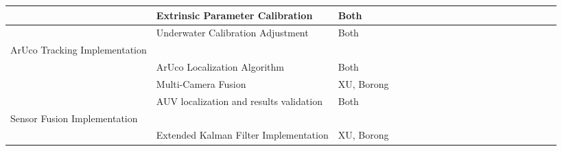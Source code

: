 \documentclass[11pt]{article}
\begin{document}
\begin{adjustbox}{max width=\textheight, angle=90}
\begin{tabular}{|p{3cm}|p{3cm}|p{1.5cm}|p{0.75cm}|p{0.75cm}|p{0.75cm}|p{0.75cm}|p{0.75cm}|p{0.75cm}|p{0.75cm}|p{0.75cm}|p{0.75cm}|p{0.9cm}|p{0.9cm}|p{0.9cm}|p{0.9cm}|p{0.9cm}|p{0.9cm}|p{0.9cm}|p{0.9cm}|}
        \hline
         &Extrinsic Parameter Calibration&Both&  &  &  &  &  &\cellcolor{yellow!20}&\cellcolor{yellow!20}&\cellcolor{yellow!20}&  &  &  &  &\cellcolor{yellow!20}&\cellcolor{yellow!20}&  &  &  \\
        \hline
         &Underwater Calibration Adjustment&Both&  &  &  &  &  &  &  &  &\cellcolor{yellow!20}&\cellcolor{yellow!20}&  &  &  &  &\cellcolor{yellow!20}&\cellcolor{yellow!20}&\cellcolor{yellow!20}\\
         \hline
         ArUco Tracking Implementation&  &  &  &  &\cellcolor{blue!20}&\cellcolor{blue!20}&\cellcolor{blue!20}&\cellcolor{blue!20}&  &  &  &\cellcolor{blue!20}&\cellcolor{blue!20}&\cellcolor{blue!20}&\cellcolor{blue!20}&\cellcolor{blue!20}&\cellcolor{blue!20}&\cellcolor{blue!20}&\cellcolor{blue!20} \\
         \hline
         & ArUco Localization Algorithm&Both&  &  &\cellcolor{yellow!20}&\cellcolor{yellow!20}&\cellcolor{yellow!20}&\cellcolor{yellow!20}&  &  &  &\cellcolor{yellow!20}&\cellcolor{yellow!20}&  &  &  &  &  &  \\
         \hline
         &Multi-Camera Fusion&XU, Borong&  &  &  &  &  &  &  &  &  &  &\cellcolor{yellow!20}&\cellcolor{yellow!20}&\cellcolor{yellow!20}&\cellcolor{yellow!20}&  &  &  \\
         \hline
         &AUV localization and results validation&Both&  &  &  &  &  &  &  &  &  &  &  &  &  &  &\cellcolor{yellow!20}&\cellcolor{yellow!20}&\cellcolor{yellow!20}\\
         \hline
         Sensor Fusion Implementation&  &  &  &  &  &  &  &  &  &  &  &  & &\cellcolor{blue!20}&\cellcolor{blue!20}&\cellcolor{blue!20}&\cellcolor{blue!20}&\cellcolor{blue!20}&\cellcolor{blue!20}\\
         \hline
         &Extended Kalman Filter Implementation&XU, Borong&  &  &  &  &  &  &  &  &  &  &  &\cellcolor{yellow!20}&\cellcolor{yellow!20}&\cellcolor{yellow!20}&\cellcolor{yellow!20}&\cellcolor{yellow!20}&\cellcolor{yellow!20}\\
        \hline
        \end{tabular}
        \end{adjustbox}
        \label{tab:placeholder}
\end{document}
